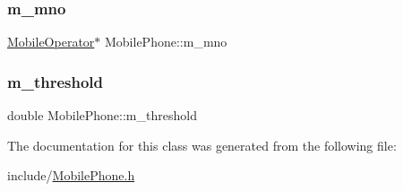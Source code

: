 \mbox{\label{class_mobile_phone_a1b26abc840ac8f8679dd62939330c597}} 
\subsubsection{\texorpdfstring{m\_mno}{m\_mno}}
{\footnotesize\ttfamily \mbox{\hyperlink{class_mobile_operator}{Mobile\+Operator}}$\ast$ Mobile\+Phone\+::m\+\_\+mno\hspace{0.3cm}{\ttfamily [private]}}

\mbox{\label{class_mobile_phone_afb6364675f7cf6e09856f49ae6c10563}} 
\subsubsection{\texorpdfstring{m\_threshold}{m\_threshold}}
{\footnotesize\ttfamily double Mobile\+Phone\+::m\+\_\+threshold\hspace{0.3cm}{\ttfamily [private]}}



The documentation for this class was generated from the following file\+:\begin{DoxyCompactItemize}
\item 
include/\mbox{\hyperlink{_mobile_phone_8h}{Mobile\+Phone.\+h}}\end{DoxyCompactItemize}
